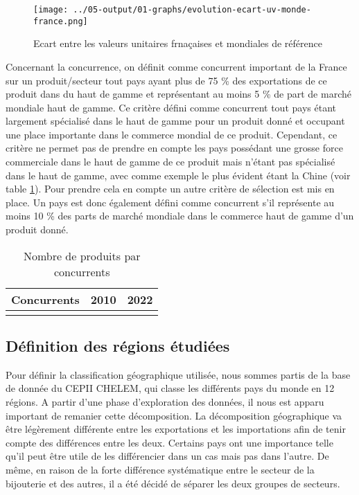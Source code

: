 \documentclass[french,10pt,a4paper]{article}
\begin{document}
\begin{figure}[!h]
  \centering
  \texttt{[image: ../05-output/01-graphs/evolution-ecart-uv-monde-france.png]}
  \caption{Ecart entre les valeurs unitaires frnaçaises et mondiales de référence}

\end{figure}

Concernant la concurrence, on définit comme concurrent important de la France sur un produit/secteur tout pays ayant plus de 75 \% des exportations de ce produit dans du haut de gamme et représentant au moins 5 \% de part de marché mondiale haut de gamme. Ce critère défini comme concurrent tout pays étant largement spécialisé dans le haut de gamme pour un produit donné et occupant une place importante dans le commerce mondial de ce produit. Cependant, ce critère ne permet pas de prendre en compte les pays possédant une grosse force commerciale dans le haut de gamme de ce produit mais n'étant pas spécialisé dans le haut de gamme, avec comme exemple le plus évident étant la Chine (voir table \ref{tab:nb-product-by-concu}). Pour prendre cela en compte un autre critère de sélection est mis en place. Un pays est donc également défini comme concurrent s'il représente au moins 10 \% des parts de marché mondiale dans le commerce haut de gamme d'un produit donné.

\begin{table}[ht]
  \centering
  \begin{tabular}{lrr}
    \hline
   Concurrents & 2010 & 2022 \\
    \hline
    \\
    \hline
  \end{tabular}
  \caption{Nombre de produits par concurrents}
  \label{tab:nb-product-by-concu}
\end{table}

\subsection{Définition des régions étudiées}

Pour définir la classification géographique utilisée, nous sommes partis de la base de donnée du CEPII CHELEM, qui classe les différents pays du monde en 12 régions. A partir d'une phase d'exploration des données, il nous est apparu important de remanier cette décomposition. La décomposition géographique va être légèrement différente entre les exportations et les importations afin de tenir compte des différences entre les deux. Certains pays ont une importance telle qu'il peut être utile de les différencier dans un cas mais pas dans l'autre. De même, en raison de la forte différence systématique entre le secteur de la bijouterie et des autres, il a été décidé de séparer les deux groupes de secteurs.
\end{document}
